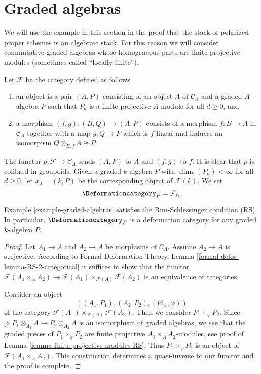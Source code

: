 \section{Graded algebras}
\label{section-graded-algebras}

\noindent
We will use the example in this section in the proof that the stack of
polarized proper schemes is an algebraic stack. For this reason we will
consider commutative graded algebras whose homogeneous parts are
finite projective modules (sometimes called ``locally finite'').

\begin{example}
\label{example-graded-algebras}
Let $\mathcal{F}$ be the category defined as follows
\begin{enumerate}
\item an object is a pair $(A, P)$ consisting of an
object $A$ of $\mathcal{C}_\Lambda$ and a graded $A$-algebra $P$
such that $P_d$ is a finite projective $A$-module for all $d \geq 0$, and
\item a morphism $(f, g) : (B, Q) \to (A, P)$ consists of
a morphism $f : B \to A$ in $\mathcal{C}_\Lambda$ together
with a map $g : Q \to P$ which is $f$-linear and induces an
isomorpism $Q \otimes_{B, f} A \cong P$.
\end{enumerate}
The functor $p : \mathcal{F} \to \mathcal{C}_\Lambda$ sends $(A, P)$
to $A$ and $(f, g)$ to $f$. It is clear that $p$ is cofibred in groupoids.
Given a graded $k$-algebra $P$ with $\dim_k(P_d) < \infty$ for all
$d \geq 0$, let $x_0 = (k, P)$ be the corresponding object of $\mathcal{F}(k)$.
We set
$$
\Deformationcategory_P = \mathcal{F}_{x_0}
$$
\end{example}

\begin{lemma}
\label{lemma-graded-algebras-RS}
Example \ref{example-graded-algebras}
satisfies the Rim-Schlessinger condition (RS).
In particular, $\Deformationcategory_P$ is a deformation category
for any graded $k$-algebra $P$.
\end{lemma}

\begin{proof}
Let $A_1 \to A$ and $A_2 \to A$ be morphisms of $\mathcal{C}_\Lambda$.
Assume $A_2 \to A$ is surjective. According to
Formal Deformation Theory, Lemma
\ref{formal-defos-lemma-RS-2-categorical}
it suffices to show that the functor
$\mathcal{F}(A_1 \times_A A_2) \to
\mathcal{F}(A_1) \times_{\mathcal{F}(A)} \mathcal{F}(A_2)$
is an equivalence of categories.

\medskip\noindent
Consider an object
$$
((A_1, P_1), (A_2, P_2), (\text{id}_A, \varphi))
$$
of the category $\mathcal{F}(A_1) \times_{\mathcal{F}(A)} \mathcal{F}(A_2)$.
Then we consider $P_1 \times_\varphi P_2$. Since
$\varphi : P_1 \otimes_{A_1} A \to P_2 \otimes_{A_2} A$
is an isomorphism of graded algebras, we see that the graded pieces
of $P_1 \times_\varphi P_2$ are finite projective $A_1 \times_A A_2$-modules,
see proof of Lemma \ref{lemma-finite-projective-modules-RS}.
Thus $P_1 \times_\varphi P_2$ is an object of $\mathcal{F}(A_1 \times_A A_2)$.
This construction determines a quasi-inverse to our functor
and the proof is complete.
\end{proof}

